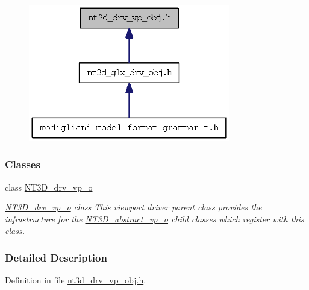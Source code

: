 \nopagebreak
\begin{figure}[H]
\begin{center}
\leavevmode
\includegraphics[width=250pt]{nt3d__drv__vp__obj_8h__dep__incl}
\end{center}
\end{figure}
\subsubsection*{Classes}
\begin{DoxyCompactItemize}
\item 
class \hyperlink{class_n_t3_d__drv__vp__o}{NT3D\_\-drv\_\-vp\_\-o}
\begin{DoxyCompactList}\small\item\em \hyperlink{class_n_t3_d__drv__vp__o}{NT3D\_\-drv\_\-vp\_\-o} class This viewport driver parent class provides the infrastructure for the \hyperlink{class_n_t3_d__abstract__vp__o}{NT3D\_\-abstract\_\-vp\_\-o} child classes which register with this class. \item\end{DoxyCompactList}\end{DoxyCompactItemize}


\subsubsection{Detailed Description}


Definition in file \hyperlink{nt3d__drv__vp__obj_8h_source}{nt3d\_\-drv\_\-vp\_\-obj.h}.

